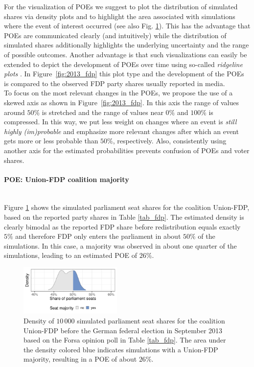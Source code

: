 \documentclass[smallcondensed]{svjour3}     %
\begin{document}
For the visualization of POEs we suggest to plot the distribution of
simulated shares via density plots and to highlight the area associated
with simulations where the event of interest occurred
(see also Fig. \ref{fig:seatDist}). This has the advantage that POEs are
communicated clearly (and intuitively) while the distribution of simulated
shares additionally highlights the underlying uncertainty and the range
of possible outcomes. Another advantage is that such visualizations can easily
be extended to depict the development of POEs over time using so-called
\emph{ridgeline plots} \citep{wilke_2017}. In Figure~\ref{fig:2013_fdp} this
plot type and the development of the POEs is compared to the observed 
FDP party shares usually reported in media. \\

To focus on the most relevant changes in the POEs, we propose
the use of a skewed axis as shown in Figure~\ref{fig:2013_fdp}. In this axis
the range of values around $50\%$ is stretched and the range of values near
$0\%$ and $100\%$ is compressed. In this way, we put less weight on changes
where an event is {\it still highly (im)probable} and emphasize more relevant
changes after which an event gets more or less probable than $50\%$, respectively. Also,
consistently using another axis for the estimated probabilities prevents
confusion of POEs and voter shares.


\paragraph{POE: Union-FDP coalition majority} \ \\

Figure \ref{fig:seatDist} shows the simulated parliament seat shares for the
coalition Union-FDP, based on the reported party shares in Table \ref{tab_fdp}.
The estimated density is clearly bimodal as the reported FDP share before
redistribution equals exactly $5\%$ and therefore FDP only enters the parliament
in about $50\%$ of the simulations. In this case, a majority was observed in about
one quarter of the simulations, leading to an estimated POE of $26\%$. \\

\begin{figure}[H]\centering
\includegraphics[width=0.45\textwidth]{figures/2013_forsa_cdufdp_lastPreelectionPoll.pdf}
\caption{Density of $10\,000$ simulated parliament seat shares for the coalition
Union-FDP before the German federal election in September 2013 based on the Forsa
opinion poll in Table \ref{tab_fdp}. The area under the density colored blue
indicates simulations with a Union-FDP majority, resulting in a
POE of about $26\%$.
\label{fig:seatDist}
}
\end{figure}
\end{document}

